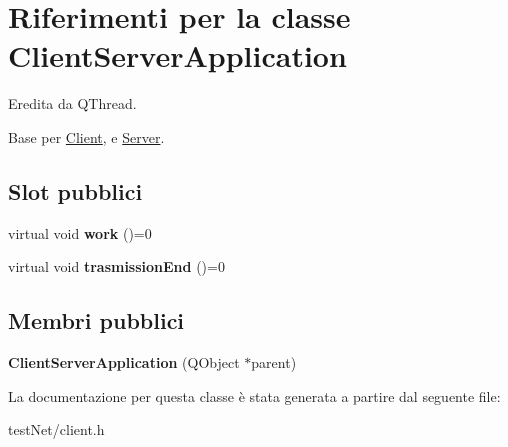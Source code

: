 \hypertarget{class_client_server_application}{\section{Riferimenti per la classe Client\-Server\-Application}
\label{class_client_server_application}
}


Eredita da Q\-Thread.



Base per \hyperlink{class_client}{Client}, e \hyperlink{class_server}{Server}.

\subsection*{Slot pubblici}
\begin{DoxyCompactItemize}
\item 
\hypertarget{class_client_server_application_ab4389ed734f1aa2fb7fd803266bb7e65}{virtual void {\bfseries work} ()=0}\label{class_client_server_application_ab4389ed734f1aa2fb7fd803266bb7e65}

\item 
\hypertarget{class_client_server_application_a4aa64c6371a5294788647983cac9f1f6}{virtual void {\bfseries trasmission\-End} ()=0}\label{class_client_server_application_a4aa64c6371a5294788647983cac9f1f6}

\end{DoxyCompactItemize}
\subsection*{Membri pubblici}
\begin{DoxyCompactItemize}
\item 
\hypertarget{class_client_server_application_a890dbc4526e905b1e78c0c67e8a44608}{{\bfseries Client\-Server\-Application} (Q\-Object $\ast$parent)}\label{class_client_server_application_a890dbc4526e905b1e78c0c67e8a44608}

\end{DoxyCompactItemize}


La documentazione per questa classe è stata generata a partire dal seguente file\-:\begin{DoxyCompactItemize}
\item 
test\-Net/client.\-h\end{DoxyCompactItemize}
